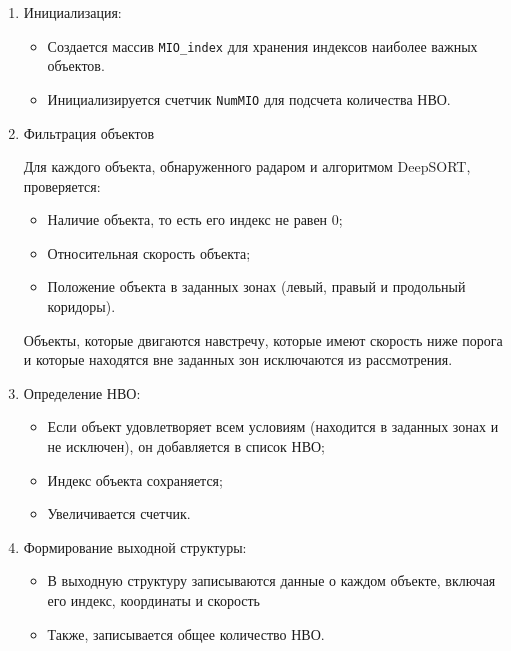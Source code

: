 \begin{enumerate}

    \item Инициализация:

    \begin{itemize}

        \item Создается массив \lstinline:MIO_index: для хранения индексов наиболее важных объектов.

        \item Инициализируется счетчик \lstinline:NumMIO: для подсчета количества НВО.

    \end{itemize}

    \item Фильтрация объектов

    Для каждого объекта, обнаруженного радаром и алгоритмом DeepSORT, проверяется:

    \begin{itemize}

        \item Наличие объекта, то есть его индекс не равен 0;
        
        \item Относительная скорость объекта;

        \item Положение объекта в заданных зонах (левый, правый и продольный коридоры).

    \end{itemize}

    Объекты, которые двигаются навстречу, которые имеют скорость ниже порога и которые находятся вне заданных зон исключаются из рассмотрения.

    \item Определение НВО:

    \begin{itemize}

        \item Если объект удовлетворяет всем условиям (находится в заданных зонах и не исключен), он добавляется в список НВО;

        \item Индекс объекта сохраняется;

        \item Увеличивается счетчик.

    \end{itemize}

    \item Формирование выходной структуры:

    \begin{itemize}

        \item В выходную структуру записываются данные о каждом объекте, включая его индекс, координаты и скорость

        \item Также, записывается общее количество НВО.

    \end{itemize}

\end{enumerate}

